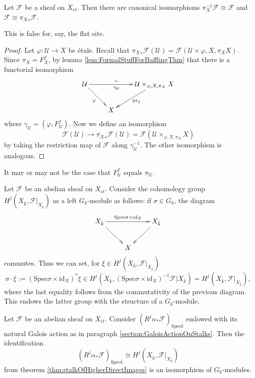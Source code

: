 \begin{lemma}
Let $\mathcal{F}$ be a sheaf on $X_{et}$. Then there are canonical isomorphisms $\pi_X^{-1} \mathcal{F} \cong \mathcal{F}$ and $\mathcal{F} \cong {\pi_X}_* \mathcal{F}$.
\end{lemma}

This is false for, say, the flat site.

\begin{proof}
Let $\varphi: \mathcal{U} \to X$ be \'etale. Recall that ${\pi_X}_* \mathcal{F} (\mathcal{U}) = \mathcal{F} (\mathcal{U} \times{\varphi, X, \pi_X} X)$. Since $\pi_X = F_X^f$, by lemma \ref{lem:FormalStuffForBafflingThm} that there is a functorial isomorphism
$$
\xymatrix{
\mathcal{U} \ar_{\varphi}[rd] \ar^{\sim \quad}_{\gamma_\mathcal{U} \quad}[rr] &&  {\mathcal{U} \times_{\varphi, X, \pi_X} X} \ar^{\text{pr}_2}[ld]\\
& X
}
$$
where $\gamma_\mathcal{U} = (\varphi, F_\mathcal{U}^f)$. Now we define an isomorphism
$$
\mathcal{F} (\mathcal{U}) \longrightarrow {\pi_X}_* \mathcal{F} (\mathcal{U}) = \mathcal{F} (\mathcal{U} \times_{\varphi, X, \pi_X} X)
$$
by taking the restriction map of $\mathcal{F}$ along $\gamma_\mathcal{U}^{-1}$. The other isomorphism is analogous. 
\end{proof}

\begin{remark}
It may or may not be the case that $F^f_\mathcal{U}$ equals $\pi_\mathcal{U}$.
\end{remark}

Let $\mathcal{F}$ be an abelian sheaf on $X_{et}$. Consider the cohomology group $H^j (X_{\bar k}, \mathcal{F}|_{X_{\bar k}})$ as a left $G_k$-module as follows: if $\sigma \in G_k$, the diagram 
$$
\xymatrix{
X_{\bar k} \ar[rd] \ar^{\text{Spec} \sigma \times \text{id}_X}[rr] && X_{\bar k} \ar[ld]\\
& X
}
$$
commutes. Thus we can set, for $\xi \in H^j (X_{\bar k}, \mathcal{F}|_{X_{\bar k}})$
$$
\sigma \cdot \xi := (\text{Spec} \sigma \times \text{id}_X)^*\xi \in H^j(X_{\bar k}, (\text{Spec} \sigma \times \text{id}_X)^{-1} \mathcal{F}|{X_{\bar k}})
= H^j (X_{\bar k}, \mathcal{F}|_{X_{\bar k}}),
$$
where the last equality follows from the commutativity of the previous diagram. This endows the latter group with the structure of a $G_k$-module.

\begin{lemma}
Let $\mathcal{F}$ be an abelian sheaf on $X_{et}$. Consider $(R^j\alpha_*\mathcal{F})_{\text{Spec} \bar k}$ endowed with its natural Galois action as in paragraph \ref{section:GaloisActionOnStalks}. Then the identification
$$
(R^j\alpha_*\mathcal{F})_{\text{Spec} \bar k} \cong H^j (X_{\bar k}, \mathcal{F}|_{X_{\bar k}})
$$
from theorem \ref{thm:stalkOfHigherDirectImages} is an isomorphism of $G_k$-modules.
\end{lemma}

